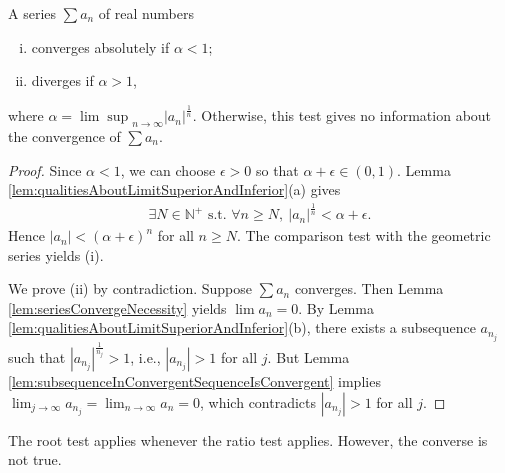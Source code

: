 \begin{thm}
  \label{thm:rootTest}
  A series $\sum a_n$ of real numbers
  \begin{enumerate}[(i)]\itemsep0em
  \item converges absolutely if $\alpha<1$;
  \item diverges if $\alpha>1$,
  \end{enumerate}
  where $\alpha={\lim\sup}_{n\rightarrow\infty}|a_n|^{\frac{1}{n}}$.
  Otherwise, this test gives no information
  about the convergence of $\sum a_n$.
\end{thm}
\begin{proof}
  Since $\alpha<1$, we can choose $\epsilon>0$ so that $\alpha+\epsilon\in (0,1)$.
  Lemma \ref{lem:qualitiesAboutLimitSuperiorAndInferior}(a) gives
  \begin{displaymath}
    \begin{array}{l}
    \exists N\in \mathbb{N}^+ \text{ s.t. }
    \forall n\ge N,
    \ |a_n|^{\frac{1}{n}} < \alpha+\epsilon.
    \end{array}
  \end{displaymath}
  Hence $|a_n|<(\alpha+\epsilon)^n$ for all $n\ge N$.
  The comparison test with the geometric series yields (i).

  We prove (ii) by contradiction.
  Suppose $\sum a_{n}$ converges.
  Then Lemma \ref{lem:seriesConvergeNecessity}
  yields $\lim a_{n}=0$.
  By Lemma \ref{lem:qualitiesAboutLimitSuperiorAndInferior}(b),
  there exists a subsequence $a_{n_{j}}$ such that
  $|a_{n_{j}}|^{\frac{1}{n_{j}}}>1$, i.e., $|a_{n_{j}}|>1$ for all $j$.
  But Lemma \ref{lem:subsequenceInConvergentSequenceIsConvergent} implies
  $\lim_{j\rightarrow\infty} a_{n_{j}}=\lim_{n\rightarrow\infty}a_{n}=0$,
  which contradicts $|a_{n_{j}}|>1$ for all $j$.
\end{proof}

\begin{rem}
  The root test applies whenever the ratio test applies.
  However, the converse is not true.
\end{rem}

